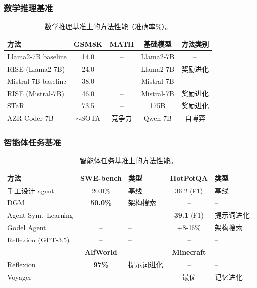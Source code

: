 \subsubsection{数学推理基准}

\begin{table}[htbp]
\centering
\caption{数学推理基准上的方法性能（准确率\%）。}
\label{tab:math-benchmark}
\begin{tabular}{lcccc}
\toprule
\textbf{方法} & \textbf{GSM8K} & \textbf{MATH} & \textbf{基础模型} & \textbf{方法类别} \\
\midrule
Llama2-7B baseline & 14.0 & -- & Llama2-7B & -- \\
RISE (Llama2-7B) & 24.0 & -- & Llama2-7B & 奖励进化 \\
Mistral-7B baseline & 38.0 & -- & Mistral-7B & -- \\
RISE (Mistral-7B) & 46.0 & -- & Mistral-7B & 奖励进化 \\
STaR & 73.5 & -- & 175B & 奖励进化 \\
AZR-Coder-7B & $\sim$SOTA & 竞争力 & Qwen-7B & 自博弈 \\
\bottomrule
\end{tabular}
\end{table}

\subsubsection{智能体任务基准}

\begin{table}[htbp]
\centering
\caption{智能体任务基准上的方法性能。}
\label{tab:agent-benchmark}
\begin{tabular}{lclcl}
\toprule
\textbf{方法} & \textbf{SWE-bench} & \textbf{类型} & \textbf{HotPotQA} & \textbf{类型} \\
\midrule
手工设计 agent & 20.0\% & 基线 & 36.2 (F1) & 基线 \\
DGM & \textbf{50.0\%} & 架构搜索 & -- & -- \\
Agent Sym.\ Learning & -- & -- & \textbf{39.1} (F1) & 提示词进化 \\
Gödel Agent & -- & -- & +8-15\% & 架构搜索 \\
Reflexion (GPT-3.5) & -- & -- & -- & -- \\
\midrule
& \textbf{AlfWorld} & & \textbf{Minecraft} & \\
\midrule
Reflexion & \textbf{97\%} & 提示词进化 & -- & -- \\
Voyager & -- & -- & 最优 & 记忆进化 \\
\bottomrule
\end{tabular}
\end{table}

